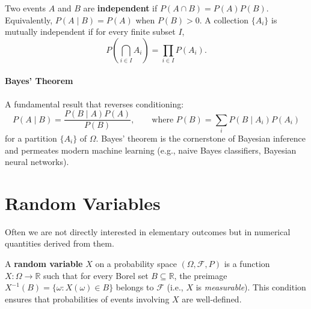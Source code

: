 \documentclass{tufte-handout}
\begin{document}
\begin{defn}[Independence]
    Two events $A$ and $B$ are \textbf{independent} if $P(A \cap B) = P(A)P(B)$. Equivalently, $P(A \mid B) = P(A)$ when $P(B)>0$. A collection $\{A_i\}$ is mutually independent if for every finite subset $I$,
    \[
    P\!\left(\bigcap_{i \in I} A_i\right) = \prod_{i \in I} P(A_i).
    \]
\end{defn}

\paragraph{Bayes' Theorem}
A fundamental result that reverses conditioning:
\[
P(A \mid B) = \frac{P(B \mid A) P(A)}{P(B)}, \qquad \text{where } P(B) = \sum_i P(B \mid A_i)P(A_i)
\]
for a partition $\{A_i\}$ of $\Omega$. Bayes' theorem is the cornerstone of Bayesian inference and permeates modern machine learning (e.g., naive Bayes classifiers, Bayesian neural networks).

\begin{marginfigure}
\centering
{}
\caption{Bayes' theorem relates $P(A|B)$ to $P(B|A)$ via the prior $P(A)$ and evidence $P(B)$.}
\end{marginfigure}

\section{Random Variables}

Often we are not directly interested in elementary outcomes but in numerical quantities derived from them.

\begin{defn}
    A \textbf{random variable} $X$ on a probability space $(\Omega,\mathcal{F},P)$ is a function $X: \Omega \to \mathbb{R}$ such that for every Borel set $B \subseteq \mathbb{R}$, the preimage $X^{-1}(B) = \{\omega: X(\omega) \in B\}$ belongs to $\mathcal{F}$ (i.e., $X$ is \textit{measurable}). This condition ensures that probabilities of events involving $X$ are well-defined.
\end{defn}
\end{document}
